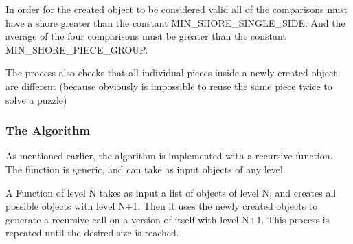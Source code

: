\documentclass{article}
\begin{document}
In order for the created object to be considered valid all of the comparisons must have a shore greater
than the constant MIN\_SHORE\_SINGLE\_SIDE. And the average of the four comparisons must be greater
than the constant MIN\_SHORE\_PIECE\_GROUP.

The process also checks that all individual pieces inside a newly
created object are different (because obviously is impossible to reuse the same piece twice to solve a puzzle)
\subsubsection{The Algorithm}

As mentioned earlier, the algorithm is implemented with a recursive function.
The function is generic, and can take as input objects of any level.

A Function of level N takes as input a list of objects of level N,
and creates all possible objects with level N+1.
Then it uses the newly created objects to generate a recursive call on a version
of itself with level N+1.
This process is repeated until the desired size is reached.
\end{document}
